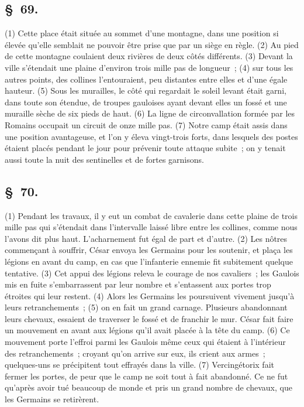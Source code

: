\documentclass[french,twoside]{book} %
\begin{document}
\subsection[{§ 69.}]{ \textsc{§ 69.} }
\noindent (1) Cette place était située au sommet d’une montagne, dans une position si élevée qu’elle semblait ne pouvoir être prise que par un siège en règle. (2) Au pied de cette montagne coulaient deux rivières de deux côtés différents. (3) Devant la ville s’étendait une plaine d’environ trois mille pas de longueur ; (4) sur tous les autres points, des collines l’entouraient, peu distantes entre elles et d’une égale hauteur. (5) Sous les murailles, le côté qui regardait le soleil levant était garni, dans toute son étendue, de troupes gauloises ayant devant elles un fossé et une muraille sèche de six pieds de haut. (6) La ligne de circonvallation formée par les Romains occupait un circuit de onze mille pas. (7) Notre camp était assis dans une position avantageuse, et l’on y éleva vingt-trois forts, dans lesquels des postes étaient placés pendant le jour pour prévenir toute attaque subite ; on y tenait aussi toute la nuit des sentinelles et de fortes garnisons.
\subsection[{§ 70.}]{ \textsc{§ 70.} }
\noindent (1) Pendant les travaux, il y eut un combat de cavalerie dans cette plaine de trois mille pas qui s’étendait dans l’intervalle laissé libre entre les collines, comme nous l’avons dit plus haut. L'acharnement fut égal de part et d’autre. (2) Les nôtres commençant à souffrir, César envoya les Germains pour les soutenir, et plaça les légions en avant du camp, en cas que l’infanterie ennemie fit subitement quelque tentative. (3) Cet appui des légions releva le courage de nos cavaliers ; les Gaulois mis en fuite s’embarrassent par leur nombre et s’entassent aux portes trop étroites qui leur restent. (4) Alors les Germains les poursuivent vivement jusqu’à leurs retranchements ; (5) on en fait un grand carnage. Plusieurs abandonnant leurs chevaux, essaient de traverser le fossé et de franchir le mur. César fait faire un mouvement en avant aux légions qu’il avait placée à la tête du camp. (6) Ce mouvement porte l’effroi parmi les Gaulois même ceux qui étaient à l’intérieur des retranchements ; croyant qu’on arrive sur eux, ils crient aux armes ; quelques-uns se précipitent tout effrayés dans la ville. (7) Vercingétorix fait fermer les portes, de peur que le camp ne soit tout à fait abandonné. Ce ne fut qu’après avoir tué beaucoup de monde et pris un grand nombre de chevaux, que les Germains se retirèrent.
\end{document}
